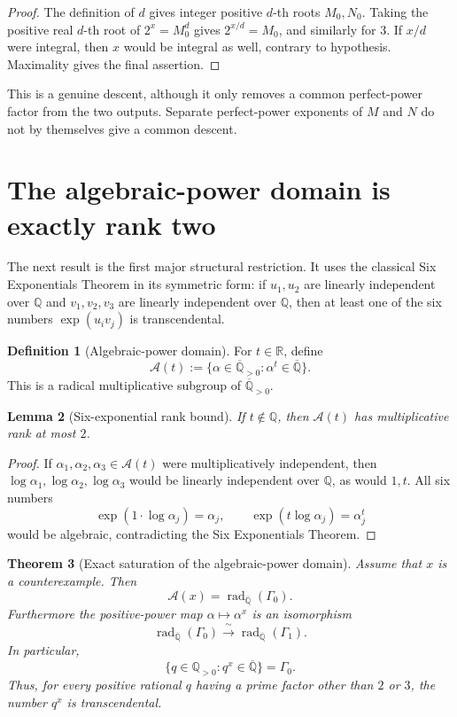 \documentclass[11pt]{article}
\newtheorem{theorem}{Theorem}[section]
\newtheorem{lemma}[theorem]{Lemma}
\theoremstyle{definition}
\newtheorem{definition}[theorem]{Definition}
\newcommand{\Q}{\mathbb{Q}}
\newcommand{\R}{\mathbb{R}}
\newcommand{\Qbar}{\overline{\mathbb{Q}}}
\newcommand{\rad}{\operatorname{rad}}
\newcommand{\Gammao}{\Gamma_0}
\newcommand{\Gammai}{\Gamma_1}
\newcommand{\Alg}{\mathcal{A}}
\begin{document}
\begin{proof}
The definition of $d$ gives integer positive $d$-th roots $M_0,N_0$.  Taking
the positive real $d$-th root of $2^x=M_0^d$ gives $2^{x/d}=M_0$, and similarly
for $3$.  If $x/d$ were integral, then $x$ would be integral as well, contrary
to hypothesis.  Maximality gives the final assertion.
\end{proof}

This is a genuine descent, although it only removes a common perfect-power
factor from the two outputs.  Separate perfect-power exponents of $M$ and $N$
do not by themselves give a common descent.

\section{The algebraic-power domain is exactly rank two}

The next result is the first major structural restriction.  It uses the
classical Six Exponentials Theorem in its symmetric form: if
$u_1,u_2$ are linearly independent over $\Q$ and $v_1,v_2,v_3$ are linearly
independent over $\Q$, then at least one of the six numbers
$\exp(u_i v_j)$ is transcendental.

\begin{definition}[Algebraic-power domain]
For $t\in\R$, define
\[
 \Alg(t):=\{\alpha\in\Qbar_{>0}:\alpha^t\in\Qbar\}.
\]
This is a radical multiplicative subgroup of $\Qbar_{>0}$.
\end{definition}

\begin{lemma}[Six-exponential rank bound]
\label{lem:six-rank}
If $t\notin\Q$, then $\Alg(t)$ has multiplicative rank at most $2$.
\end{lemma}

\begin{proof}
If $\alpha_1,\alpha_2,\alpha_3\in\Alg(t)$ were multiplicatively independent,
then $\log\alpha_1,\log\alpha_2,\log\alpha_3$ would be linearly independent
over $\Q$, as would $1,t$.  All six numbers
\[
  \exp(1\cdot\log\alpha_j)=\alpha_j,
  \qquad
  \exp(t\log\alpha_j)=\alpha_j^t
\]
would be algebraic, contradicting the Six Exponentials Theorem.
\end{proof}

\begin{theorem}[Exact saturation of the algebraic-power domain]
\label{thm:saturation}
Assume that $x$ is a counterexample.  Then
\[
       \Alg(x)=\rad_{\Qbar}(\Gammao).
\]
Furthermore the positive-power map $\alpha\mapsto\alpha^x$ is an isomorphism
\[
   \rad_{\Qbar}(\Gammao)
      \xrightarrow{\ \sim\ }
   \rad_{\Qbar}(\Gammai).
\]
In particular,
\[
 \{q\in\Q_{>0}:q^x\in\Qbar\}=\Gammao.
\]
Thus, for every positive rational $q$ having a prime factor other than $2$ or
$3$, the number $q^x$ is transcendental.
\end{theorem}
\end{document}

